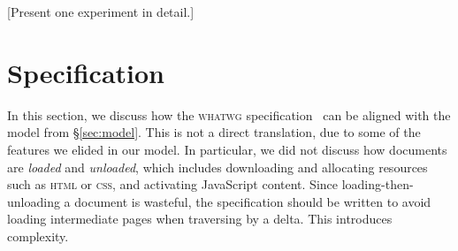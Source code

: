 \documentclass{notes}
\begin{document}
[Present one experiment in detail.]

\section{Specification}

In this section, we discuss how the \textsc{whatwg}
specification~\cite[\S7.7.2]{whatwg} can be aligned with the model
from \S\ref{sec:model}. This is not a direct translation, due to some
of the features we elided in our model. In particular, we did not
discuss how documents are \emph{loaded} and \emph{unloaded}, which
includes downloading and allocating resources such as \textsc{html} or
\textsc{css}, and activating JavaScript content. Since
loading-then-unloading a document is wasteful, the specification
should be written to avoid loading intermediate pages when traversing
by a delta. This introduces complexity.
\end{document}
